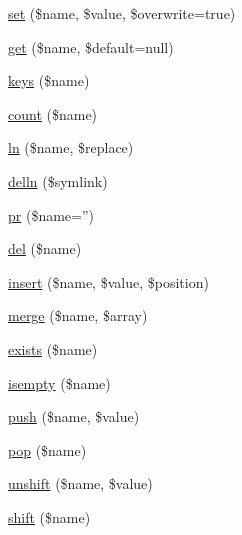 \begin{DoxyCompactItemize}
\item 
\hyperlink{class_utopia_1_1_components_1_1_core_1_1_data_object_af11d4f85f32b7aac7f9dd2ccad11b794}{set} (\$name, \$value, \$overwrite=true)
\item 
\hyperlink{class_utopia_1_1_components_1_1_core_1_1_data_object_a0f4ee84415fb0af205502dc664acde81}{get} (\$name, \$default=null)
\item 
\hyperlink{class_utopia_1_1_components_1_1_core_1_1_data_object_a53641639184b8d1658ee5288d53dd0b7}{keys} (\$name)
\item 
\hyperlink{class_utopia_1_1_components_1_1_core_1_1_data_object_a4be7f0017b0c702b3e9094cca9428315}{count} (\$name)
\item 
\hyperlink{class_utopia_1_1_components_1_1_core_1_1_data_object_a9cf6c9ead712728ddb704b0397594b82}{ln} (\$name, \$replace)
\item 
\hyperlink{class_utopia_1_1_components_1_1_core_1_1_data_object_ac334be12f886c82cc52e48c73b2644a5}{delln} (\$symlink)
\item 
\hyperlink{class_utopia_1_1_components_1_1_core_1_1_data_object_a16d040991db2582a6aa0e1994557e0fb}{pr} (\$name='')
\item 
\hyperlink{class_utopia_1_1_components_1_1_core_1_1_data_object_a446e9a1ce71ccdceb90931fa4c1043cb}{del} (\$name)
\item 
\hyperlink{class_utopia_1_1_components_1_1_core_1_1_data_object_a6a205fa6047223d02b6e816c517c39b2}{insert} (\$name, \$value, \$position)
\item 
\hyperlink{class_utopia_1_1_components_1_1_core_1_1_data_object_a25987013eb8f89f67fb24a5ee73a328a}{merge} (\$name, \$array)
\item 
\hyperlink{class_utopia_1_1_components_1_1_core_1_1_data_object_a0909de156d39accf2e3c52f4bce3765f}{exists} (\$name)
\item 
\hyperlink{class_utopia_1_1_components_1_1_core_1_1_data_object_aaf6242363698258c8943546994474355}{isempty} (\$name)
\item 
\hyperlink{class_utopia_1_1_components_1_1_core_1_1_data_object_abdec94ead09e009e567016cf3065362d}{push} (\$name, \$value)
\item 
\hyperlink{class_utopia_1_1_components_1_1_core_1_1_data_object_ad0c84757340a678f564c098d34271af1}{pop} (\$name)
\item 
\hyperlink{class_utopia_1_1_components_1_1_core_1_1_data_object_aaa62e9bddb6cb34df0ac9336e3c59a5c}{unshift} (\$name, \$value)
\item 
\hyperlink{class_utopia_1_1_components_1_1_core_1_1_data_object_a8e5c142f479ae93401a8dcde28042b52}{shift} (\$name)

\end{DoxyCompactItemize}
